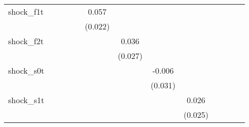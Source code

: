 {\begin{tabular}{l*{12}{c}}
\addlinespace
shock\_f1t   &                     &                     &                     &                     &       0.057\sym{**} &                     &                     &                     &                     &                     &                     &                     \\
            &                     &                     &                     &                     &     (0.022)         &                     &                     &                     &                     &                     &                     &                     \\
\addlinespace
shock\_f2t   &                     &                     &                     &                     &                     &       0.036         &                     &                     &                     &                     &                     &                     \\
            &                     &                     &                     &                     &                     &     (0.027)         &                     &                     &                     &                     &                     &                     \\
\addlinespace
shock\_s0t   &                     &                     &                     &                     &                     &                     &      -0.006         &                     &                     &                     &                     &                     \\
            &                     &                     &                     &                     &                     &                     &     (0.031)         &                     &                     &                     &                     &                     \\
\addlinespace
shock\_s1t   &                     &                     &                     &                     &                     &                     &                     &       0.026         &                     &                     &                     &                     \\
            &                     &                     &                     &                     &                     &                     &                     &     (0.025)         &                     &                     &                     &                     \\

\end{tabular}}
